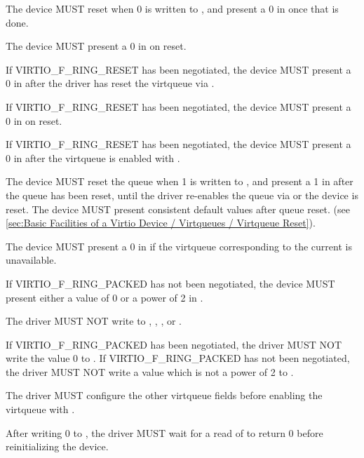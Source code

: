The device MUST reset when 0 is written to , and
present a 0 in  once that is done.

The device MUST present a 0 in  on reset.

If VIRTIO_F_RING_RESET has been negotiated, the device MUST present a 0 in
 after the driver has reset the virtqueue via
.

If VIRTIO_F_RING_RESET has been negotiated, the device MUST present a 0 in
 on reset.

If VIRTIO_F_RING_RESET has been negotiated, the device MUST present a 0 in
 after the virtqueue is enabled with .

The device MUST reset the queue when 1 is written to , and
present a 1 in  after the queue has been reset, until the
driver re-enables the queue via  or the device is reset.
The device MUST present consistent default values after queue reset.
(see \ref{sec:Basic Facilities of a Virtio Device / Virtqueues / Virtqueue Reset}).

The device MUST present a 0 in  if the virtqueue
corresponding to the current  is unavailable.

If VIRTIO_F_RING_PACKED has not been negotiated, the device MUST
present either a value of 0 or a power of 2 in
.


The driver MUST NOT write to , , ,  or .

If VIRTIO_F_RING_PACKED has been negotiated,
the driver MUST NOT write the value 0 to .
If VIRTIO_F_RING_PACKED has not been negotiated,
the driver MUST NOT write a value which is not a power of 2 to .

The driver MUST configure the other virtqueue fields before enabling the virtqueue
with .

After writing 0 to , the driver MUST wait for a read of
 to return 0 before reinitializing the device.

